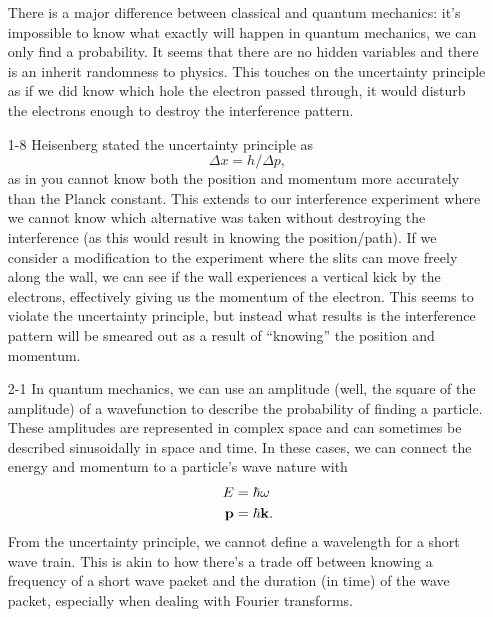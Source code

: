 \documentclass{homework}
\begin{document}
\begin{enumerate}
		There is a major difference between classical and quantum mechanics: it's impossible to know what exactly will happen in quantum mechanics, we can only find a probability. It seems that there are no hidden variables and there is an inherit randomness to physics. This touches on the uncertainty principle as if we did know which hole the electron passed through, it would disturb the electrons enough to destroy the interference pattern. 
		
		\item[1-8] Heisenberg stated the uncertainty principle as $$\Delta x = h / \Delta p,$$ as in you cannot know both the position and momentum more accurately than the Planck constant. This extends to our interference experiment where we cannot know which alternative was taken without destroying the interference (as this would result in knowing the position/path). If we consider a modification to the experiment where the slits can move freely along the wall, we can see if the wall experiences a vertical kick by the electrons, effectively giving us the momentum of the electron. This seems to violate the uncertainty principle, but instead what results is the interference pattern will be smeared out as a result of ``knowing'' the position and momentum.
		
		\pagebreak
		
		\item[2-1] In quantum mechanics, we can use an amplitude (well, the square of the amplitude) of a wavefunction to describe the probability of finding a particle. These amplitudes are represented in complex space and can sometimes be described sinusoidally in space and time. In these cases, we can connect the energy and momentum to a particle's wave nature with \begin{align*}
			E & = \hbar \omega \\
			\boldsymbol{\mathrm{p}} & = \hbar \boldsymbol{\mathrm{k}}.
		\end{align*}
		From the uncertainty principle, we cannot define a wavelength for a short wave train. This is akin to how there's a trade off between knowing a frequency of a short wave packet and the duration (in time) of the wave packet, especially when dealing with Fourier transforms.
		

\end{enumerate}
\end{document}
